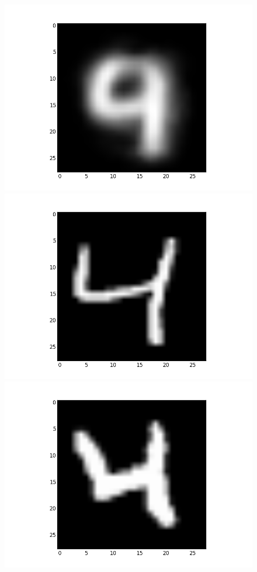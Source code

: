 \documentclass[submit]{harvardml}
\begin{document}
\begin{figure}[ht]
    \centering
    \includegraphics[scale=0.20]{mean-2}
    \includegraphics[scale=0.20]{representative-2-0}
    \includegraphics[scale=0.20]{representative-2-1}

\end{figure}
\end{document}
